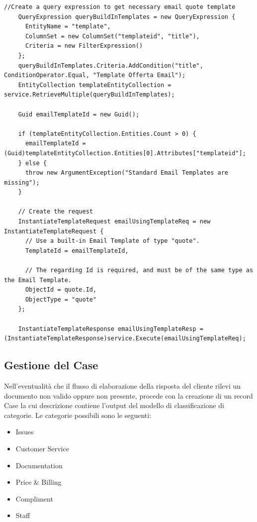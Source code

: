 \begin{lstlisting}[language={[Sharp]C},breaklines=true,label=GenerateEmailFromTemplate,caption={Metodo per la creazione di un'email a partire da un template.}]
    //Create a query expression to get necessary email quote template
    QueryExpression queryBuildInTemplates = new QueryExpression {
      EntityName = "template",
      ColumnSet = new ColumnSet("templateid", "title"),
      Criteria = new FilterExpression()
    };
    queryBuildInTemplates.Criteria.AddCondition("title", ConditionOperator.Equal, "Template Offerta Email");
    EntityCollection templateEntityCollection = service.RetrieveMultiple(queryBuildInTemplates);

    Guid emailTemplateId = new Guid();

    if (templateEntityCollection.Entities.Count > 0) {
      emailTemplateId = (Guid)templateEntityCollection.Entities[0].Attributes["templateid"];
    } else {
      throw new ArgumentException("Standard Email Templates are missing");
    }

    // Create the request
    InstantiateTemplateRequest emailUsingTemplateReq = new InstantiateTemplateRequest {
      // Use a built-in Email Template of type "quote".
      TemplateId = emailTemplateId,

      // The regarding Id is required, and must be of the same type as the Email Template.
      ObjectId = quote.Id,
      ObjectType = "quote"
    };

    InstantiateTemplateResponse emailUsingTemplateResp = (InstantiateTemplateResponse)service.Execute(emailUsingTemplateReq);
\end{lstlisting}

\subsection{Gestione del Case}
Nell'eventualità che il flusso di elaborazione della risposta del cliente rilevi un documento non valido oppure non presente, procede con la creazione di un record Case la cui descrizione contiene l'output del modello di classificazione di categorie.
Le categorie possibili sono le seguenti:
\begin{itemize}
  \item Issues
  \item Customer Service
  \item Documentation
  \item Price \& Billing
  \item Compliment
  \item Staff
\end{itemize}

